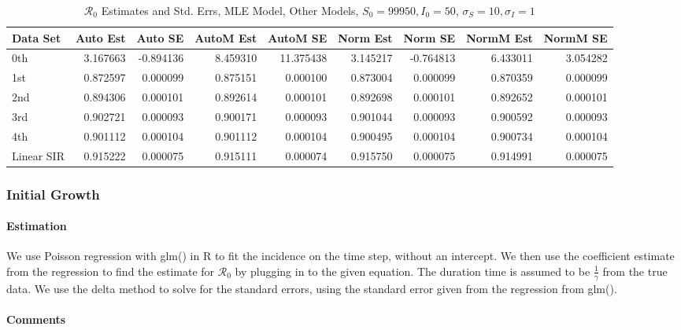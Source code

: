 \documentclass[12pt]{article}
\newcommand{\rr}{\ensuremath{\mathcal{R}_0}}
\begin{document}
\begin{table}[H]
	
	\caption{$\rr$ Estimates and Std. Errs, MLE Model,
		Other Models, $S_0 = 99950, I_0 = 50$, 
		$\sigma_S = 10, \sigma_I = 1$}
	\begin{footnotesize}
		\hskip -1cm
	\begin{tabular}{l|r|r|r|r|r|r|r|r}
		\hline
		Data Set & Auto Est & Auto SE & AutoM Est & AutoM SE & Norm Est & Norm SE & NormM Est & NormM SE\\
		\hline
		0th & 3.167663 & -0.894136 & 8.459310 & 11.375438 & 3.145217 & -0.764813 & 6.433011 & 3.054282\\
		\hline
		1st & 0.872597 & 0.000099 & 0.875151 & 0.000100 & 0.873004 & 0.000099 & 0.870359 & 0.000099\\
		\hline
		2nd & 0.894306 & 0.000101 & 0.892614 & 0.000101 & 0.892698 & 0.000101 & 0.892652 & 0.000101\\
		\hline
		3rd & 0.902721 & 0.000093 & 0.900171 & 0.000093 & 0.901044 & 0.000093 & 0.900592 & 0.000093\\
		\hline
		4th & 0.901112 & 0.000104 & 0.901112 & 0.000104 & 0.900495 & 0.000104 & 0.900734 & 0.000104\\
		\hline
		Linear SIR & 0.915222 & 0.000075 & 0.915111 & 0.000074 & 0.915750 & 0.000075 & 0.914991 & 0.000075\\
		\hline
	\end{tabular}
\end{footnotesize}
\end{table}

\subsubsection{Initial Growth}

\paragraph{Estimation}

We use Poisson regression with glm() in R to fit the incidence on the time step, without an intercept. We then use the coefficient estimate from the regression to find the estimate for $\rr$ by plugging in to the given equation. The duration time is assumed to be $\frac{1}{\gamma}$ from the true data. We use the delta method to solve for the standard errors, using the standard error given from the regression from glm().

\paragraph{Comments}
\end{document}
